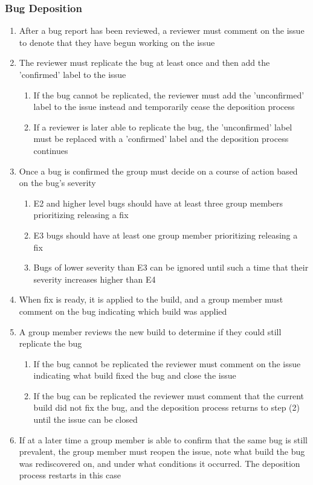 \documentclass[10pt,letterpaper]{article}
\begin{document}
\subsubsection{Bug Deposition}
\begin{enumerate}
	\item After a bug report has been reviewed, a reviewer must comment on the issue to denote that they have begun working on the issue
	\item The reviewer must replicate the bug at least once and then add the 'confirmed' label to the issue 
	\begin{enumerate}
		\item If the bug cannot be replicated, the reviewer must add the 'unconfirmed' label to the issue instead and temporarily cease the deposition process
		\item If a reviewer is later able to replicate the bug, the 'unconfirmed' label must be replaced with a 'confirmed' label and the deposition process continues
	\end{enumerate}
	\item Once a bug is confirmed the group must decide on a course of action based on the bug's severity
	\begin{enumerate}
		\item E2 and higher level bugs should have at least three group members prioritizing releasing a fix
		\item E3 bugs should have at least one group member prioritizing releasing a fix 
		\item Bugs of lower severity than E3 can be ignored until such a time that their severity increases higher than E4
	\end{enumerate} 
	\item When fix is ready, it is applied to the build, and a group member must comment on the bug indicating which build was applied
	\item A group member reviews the new build to determine if they could still replicate the bug
	\begin{enumerate}
		\item If the bug cannot be replicated the reviewer must comment on the issue indicating what build fixed the bug and close the issue
		\item If the bug can be replicated the reviewer must comment that the current build did not fix the bug, and the deposition process returns to step (2) until the issue can be closed
	\end{enumerate}
	\item If at a later time a group member is able to confirm that the same bug is still prevalent, the group member must reopen the issue, note what build the bug was rediscovered on, and under what conditions it occurred. The deposition process restarts in this case
\end{enumerate}
\end{document}
